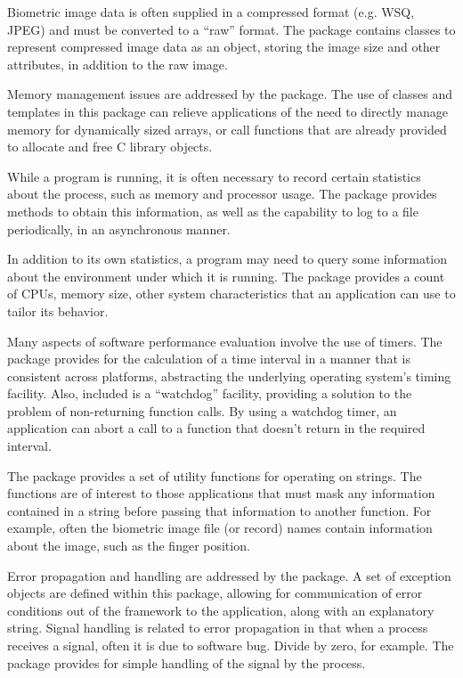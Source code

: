 Biometric image data is often supplied in a compressed format (e.g. WSQ, JPEG)
and must be converted to a ``raw'' format. The  package contains
classes to represent compressed image data as an object, storing the image
size and other attributes, in addition to the raw image.

Memory management issues are addressed by the  package. The
use of classes and templates in this package can relieve applications of the
need to directly manage memory for dynamically sized arrays, or call functions
that are already provided to allocate and free C library objects.

While a program is running, it is often necessary to record certain statistics
about the process, such as memory and processor usage. The 
package provides methods to obtain this information, as well as the capability
to log to a file periodically, in an asynchronous manner.

In addition to its own statistics, a program may need to query some
information about the environment under which it is running.
The 
package provides a count of CPUs, memory size, other system characteristics
that an application can use to tailor its behavior.

Many aspects of software performance evaluation involve the use of timers. The
 package provides for the calculation of a time interval in a manner
that is consistent across platforms, abstracting the underlying operating
system's timing facility. Also, included is a ``watchdog'' facility, providing
a solution to the problem of non-returning function calls. By using a watchdog
timer, an application can abort a call to a function that doesn't return in
the required interval.

The  package provides a set of utility functions for operating on
strings. The  functions are of interest to
those applications that must mask any information contained in a string before
passing that information to another function. For example, often the biometric
image file (or record) names contain information about the image, such as the
finger position.

Error propagation and handling are addressed by the  package. A set
of exception objects are defined within this package, allowing for communication
of error conditions out of the framework to the application, along with an
explanatory string. Signal handling is related to error propagation in that
when a process receives a signal, often it is due to software bug. Divide by
zero, for example. The  package provides for simple handling
of the signal by the process.


